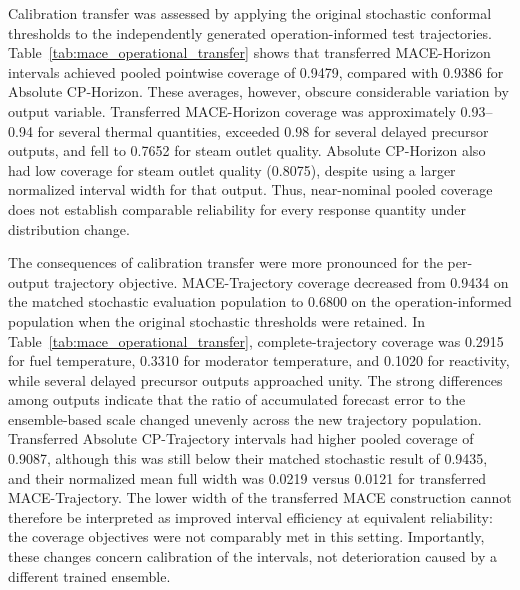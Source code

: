 Calibration transfer was assessed by applying the original stochastic conformal thresholds to the independently generated operation-informed test trajectories. Table~\ref{tab:mace_operational_transfer} shows that transferred MACE-Horizon intervals achieved pooled pointwise coverage of 0.9479, compared with 0.9386 for Absolute CP-Horizon. These averages, however, obscure considerable variation by output variable. Transferred MACE-Horizon coverage was approximately 0.93--0.94 for several thermal quantities, exceeded 0.98 for several delayed precursor outputs, and fell to 0.7652 for steam outlet quality. Absolute CP-Horizon also had low coverage for steam outlet quality (0.8075), despite using a larger normalized interval width for that output. Thus, near-nominal pooled coverage does not establish comparable reliability for every response quantity under distribution change.

The consequences of calibration transfer were more pronounced for the per-output trajectory objective. MACE-Trajectory coverage decreased from 0.9434 on the matched stochastic evaluation population to 0.6800 on the operation-informed population when the original stochastic thresholds were retained. In Table~\ref{tab:mace_operational_transfer}, complete-trajectory coverage was 0.2915 for fuel temperature, 0.3310 for moderator temperature, and 0.1020 for reactivity, while several delayed precursor outputs approached unity. The strong differences among outputs indicate that the ratio of accumulated forecast error to the ensemble-based scale changed unevenly across the new trajectory population. Transferred Absolute CP-Trajectory intervals had higher pooled coverage of 0.9087, although this was still below their matched stochastic result of 0.9435, and their normalized mean full width was 0.0219 versus 0.0121 for transferred MACE-Trajectory. The lower width of the transferred MACE construction cannot therefore be interpreted as improved interval efficiency at equivalent reliability: the coverage objectives were not comparably met in this setting. Importantly, these changes concern calibration of the intervals, not deterioration caused by a different trained ensemble.

